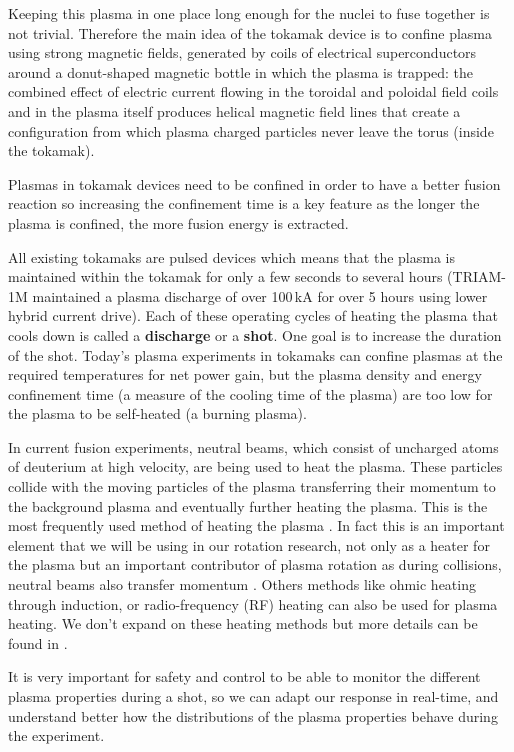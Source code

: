\documentclass[12pt,lot, lof]{puthesis}
\begin{document}
Keeping this plasma in one place long enough for the nuclei to fuse together is not trivial. Therefore the main idea of the tokamak device is to confine plasma using strong magnetic fields, generated by coils of electrical superconductors around a donut-shaped magnetic bottle in which the plasma is trapped: the combined effect of electric current flowing in the toroidal and poloidal field coils and in the plasma itself produces helical magnetic field lines that create a configuration from which plasma charged particles never leave the torus (inside the tokamak).

Plasmas in tokamak devices need to be confined in order to have a better fusion reaction so increasing the confinement time is a key feature as the longer the plasma is confined, the more fusion energy is extracted.

All existing tokamaks are pulsed devices which means that the plasma is maintained within the tokamak for only a few seconds to several hours (TRIAM-1M maintained a plasma discharge of over 100\,kA for over 5 hours using lower hybrid current drive). Each of these operating cycles of heating the plasma that cools down is called a \textbf{discharge} or a \textbf{shot}. One goal is to increase the duration of the shot. Today's plasma experiments in tokamaks can confine plasmas at the required temperatures for net power gain, but the plasma density and energy confinement time (a measure of the cooling time of the plasma) are too low for the plasma to be self-heated (a burning plasma).

In current fusion experiments, neutral beams, which consist of uncharged atoms of deuterium at high velocity, are being used to heat the plasma. These particles collide with the moving particles of the plasma transferring their momentum to the background plasma and eventually further heating the plasma. This is the most frequently used method of heating the plasma \cite{Stix72, Wagner82, Kaye85, Strachan87}. In fact this is an important element that we will be using in our rotation research, not only as a heater for the plasma but an important contributor of plasma rotation as during collisions, neutral beams also transfer momentum \cite{Suckewer79, Suckewer81, Strait07}. Others methods like ohmic heating through induction, or radio-frequency (RF) heating can also be used for plasma heating. We don't expand on these heating methods but more details can be found in \cite{Stix75, Fisch78, Kubo83, Goldston84}.

It is very important for safety and control to be able to monitor the different plasma properties during a shot, so we can adapt our response in real-time, and understand better how the distributions of the plasma properties behave during the experiment.
\end{document}
